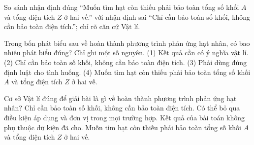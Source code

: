 \begin{bt}
So sánh nhận định đúng “Muốn tìm hạt còn thiếu phải bảo toàn tổng số khối $A$ và tổng điện tích $Z$ ở hai vế.” với nhận định sai “Chỉ cần bảo toàn số khối, không cần bảo toàn điện tích.”; chỉ rõ căn cứ Vật lí.
\end{bt}

\begin{ex}
Trong bốn phát biểu sau về hoàn thành phương trình phản ứng hạt nhân, có bao nhiêu phát biểu đúng? Chỉ ghi một số nguyên. (1) Kết quả cần có ý nghĩa vật lí. (2) Chỉ cần bảo toàn số khối, không cần bảo toàn điện tích. (3) Phải dùng đúng định luật cho tình huống. (4) Muốn tìm hạt còn thiếu phải bảo toàn tổng số khối $A$ và tổng điện tích $Z$ ở hai vế.
\end{ex}

\begin{ex}
Cơ sở Vật lí đúng để giải bài là gì về hoàn thành phương trình phản ứng hạt nhân?
\choice
{Chỉ cần bảo toàn số khối, không cần bảo toàn điện tích.}
{Có thể bỏ qua điều kiện áp dụng và đơn vị trong mọi trường hợp.}
{Kết quả của bài toán không phụ thuộc dữ kiện đã cho.}
{\True Muốn tìm hạt còn thiếu phải bảo toàn tổng số khối $A$ và tổng điện tích $Z$ ở hai vế.}
\end{ex}


